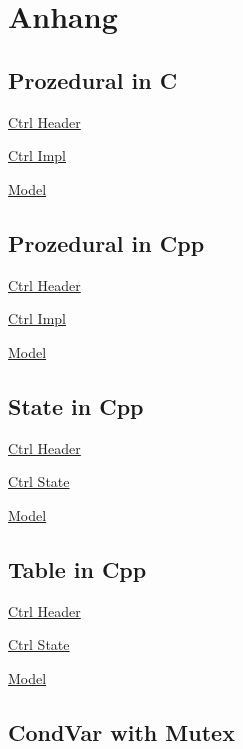 \newpage
\onecolumn
\section{Anhang}
\subsection{Prozedural in C}
\underline{Ctrl Header}


\noindent\underline{Ctrl Impl}

\noindent\underline{Model}


\subsection{Prozedural in Cpp}
\underline{Ctrl Header}

\noindent\underline{Ctrl Impl}


\underline{Model}


\subsection{State in Cpp}
\underline{Ctrl Header}

\noindent\underline{Ctrl State}

\noindent\underline{Model}


\subsection{Table in Cpp}
\underline{Ctrl Header}

\noindent\underline{Ctrl State}

\noindent\underline{Model}


\subsection{CondVar with Mutex}

